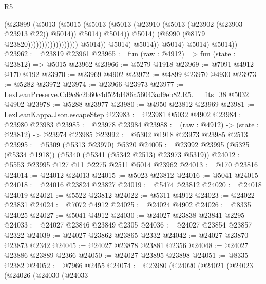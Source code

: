 \begin{lexlean}{R5}
\begin{coremodule}
                                                    (@23899
                                                      (@5013
                                                        (@5015
                                                          (@5013
                                                            (@5013
                                                              (@23910
                                                                (@5013
                                                                  (@23902 (@23903 @23913 @22))
                                                                  @5014))
                                                              @5014)
                                                            @5014))
                                                        @5014)
                                                      (@6990 (@8179 @23820))))))))))))))))))
                      @5014))
                  @5014)
                @5014))
            @5014)
          @5014)
        @5014))
@23962 := @23819 @23961
@23965 := fun (raw : @4912) => fun (state : @23812) => @5015 @23962
@23966 := @5279 @1918
@23969 := @7091 @4912 @170 @192
@23970 := @23969 @4902
@23972 := @4899 @23970 @4930
@23973 := @5282 @23972
@23974 := @23966 @23973
@23977 := LexLeanPreserve.Cd9c8c2b60c4d524d486a56043ad9eb82.R5.__fits_38 @5032 @4902
@23978 := @5288 @23977
@23980 := @4950 @23812 @23969
@23981 := LexLeanKappa.Json.escapeStep
@23983 := @23981 @5032 @4902
@23984 := @23980 @23983
@23985 := @23978 @23984
@23988 := (raw : @4912) -> (state : @23812) -> @23974 @23985
@23992 := @5302 @1918 @23973 @23985 @2513
@23995 := @5309 (@5313 @23970) @5320
@24005 := @23992 @23995 (@5325 (@5334 @1918)) (@5340 (@5341 (@5342 @2513) @23973 @5319))
@24012 := @5553 @23995 @127 @11 @2275 @2511 @5014 @23962
@24013 := @170 @23816
@24014 := @24012 @24013
@24015 := @5023 @23812
@24016 := @5041 @24015
@24018 := @24016 @23824 @23827
@24019 := @5474 @23812
@24020 := @24018 @24019
@24021 := @5522 @23812
@24022 := @5311 @4912
@24023 := @24022 @23831
@24024 := @7072 @4912
@24025 := @24024 @4902
@24026 := @8335 @24025
@24027 := @5041 @4912
@24030 := @24027 @23838 @23841 @2295
@24033 := @24027 @23846 @23849 @2305
@24036 := @24027 @23854 @23857 @2322
@24039 := @24027 @23862 @23865 @2332
@24042 := @24027 @23870 @23873 @2342
@24045 := @24027 @23878 @23881 @2356
@24048 := @24027 @23886 @23889 @2366
@24050 := @24027 @23895 @23898
@24051 := @8335 @2382
@24052 := @7966 @2455
@24074 := @23980
    (@24020
      (@24021
        (@24023
          (@24026
            (@24030
              (@24033

\end{coremodule}
\end{lexlean}
